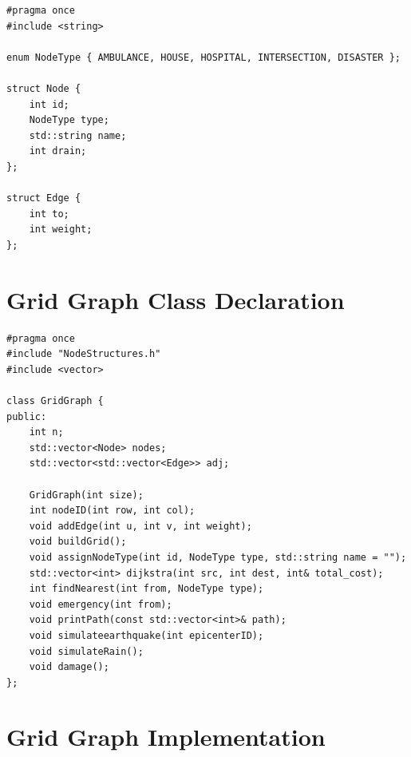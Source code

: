 \documentclass[12pt,a4paper]{report}
\begin{document}
\begin{lstlisting}[style=cpp, caption={NodeStructures.h – Node and Edge Definitions}]
#pragma once
#include <string>

enum NodeType { AMBULANCE, HOUSE, HOSPITAL, INTERSECTION, DISASTER };

struct Node {
    int id;
    NodeType type;
    std::string name;
    int drain;
};

struct Edge {
    int to;
    int weight;
};
\end{lstlisting}
\section{Grid Graph Class Declaration}

\begin{lstlisting}[style=cpp, caption={GridGraph.h – Graph Class Declaration}]
#pragma once
#include "NodeStructures.h"
#include <vector>

class GridGraph {
public:
    int n;
    std::vector<Node> nodes;
    std::vector<std::vector<Edge>> adj;

    GridGraph(int size);
    int nodeID(int row, int col);
    void addEdge(int u, int v, int weight);
    void buildGrid();
    void assignNodeType(int id, NodeType type, std::string name = "");
    std::vector<int> dijkstra(int src, int dest, int& total_cost);
    int findNearest(int from, NodeType type);
    void emergency(int from);
    void printPath(const std::vector<int>& path);
    void simulateearthquake(int epicenterID);
    void simulateRain();
    void damage();
};
\end{lstlisting}
\section{Grid Graph Implementation}
\end{document}
